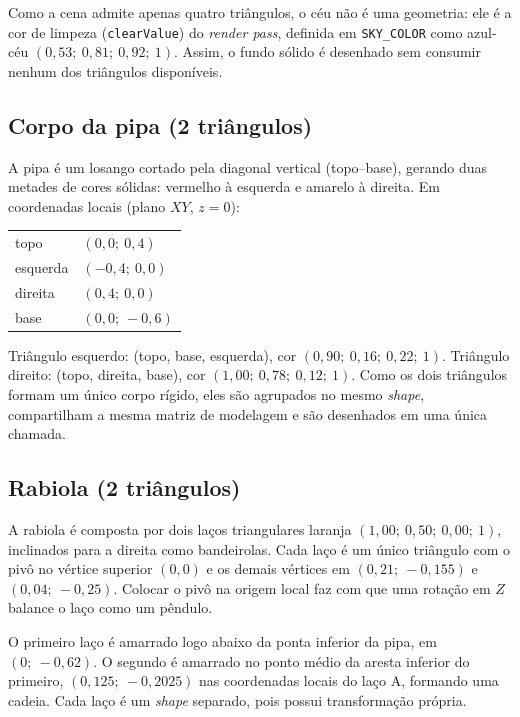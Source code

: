\documentclass[11pt,a4paper]{article}
\newcommand{\code}[1]{\texttt{#1}}
\begin{document}
Como a cena admite apenas quatro triângulos, o céu não é uma geometria: ele é a
cor de limpeza (\code{clearValue}) do \emph{render pass}, definida em
\code{SKY\_COLOR} como azul-céu $(0{,}53;\ 0{,}81;\ 0{,}92;\ 1)$. Assim, o
fundo sólido é desenhado sem consumir nenhum dos triângulos disponíveis.

\subsection{Corpo da pipa (2 triângulos)}

A pipa é um losango cortado pela diagonal vertical (topo--base), gerando duas
metades de cores sólidas: vermelho à esquerda e amarelo à direita. Em
coordenadas locais (plano $XY$, $z=0$):

\begin{center}
\begin{tabular}{ll}
    topo     & $(0{,}0;\ 0{,}4)$ \\
    esquerda & $(-0{,}4;\ 0{,}0)$ \\
    direita  & $(0{,}4;\ 0{,}0)$ \\
    base     & $(0{,}0;\ -0{,}6)$ \\
\end{tabular}
\end{center}

Triângulo esquerdo: (topo, base, esquerda), cor $(0{,}90;\ 0{,}16;\ 0{,}22;\ 1)$.
Triângulo direito: (topo, direita, base), cor $(1{,}00;\ 0{,}78;\ 0{,}12;\ 1)$.
Como os dois triângulos formam um único corpo rígido, eles são agrupados no
mesmo \emph{shape}, compartilham a mesma matriz de modelagem e são desenhados
em uma única chamada.

\subsection{Rabiola (2 triângulos)}

A rabiola é composta por dois laços triangulares laranja
$(1{,}00;\ 0{,}50;\ 0{,}00;\ 1)$, inclinados para a direita como bandeirolas.
Cada laço é um único triângulo com o pivô no vértice superior $(0,0)$ e os
demais vértices em $(0{,}21;\ -0{,}155)$ e $(0{,}04;\ -0{,}25)$. Colocar o
pivô na origem local faz com que uma rotação em $Z$ balance o laço como um
pêndulo.

O primeiro laço é amarrado logo abaixo da ponta inferior da pipa, em
$(0;\ -0{,}62)$. O segundo é amarrado no ponto médio da aresta inferior do
primeiro, $(0{,}125;\ -0{,}2025)$ nas coordenadas locais do laço A, formando
uma cadeia. Cada laço é um \emph{shape} separado, pois possui transformação
própria.
\end{document}

